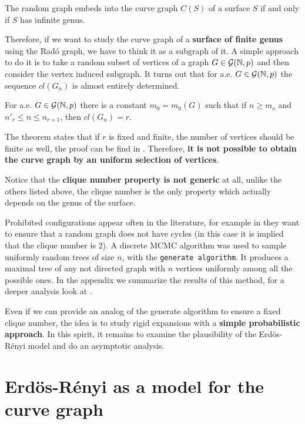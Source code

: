 \begin{theorem}
The random graph embeds into the curve graph $C(S)$ of a surface $S$ if and only if $S$ has infinite genus.
\end{theorem}

Therefore, if we want to study the curve graph of a \textbf{surface of finite genus} using the Radó graph, we have to think it as a subgraph of it. A simple approach to do it is to take a random subset of vertices of a graph $G\in \mathcal{G}(\mathbb{N}, p)$ and then consider the vertex induced subgraph. It turns out that for a.e. $G\in \mathcal{G}(\mathbb{N}, p)$ the sequence $cl(G_n)$ is almost entirely determined.

\begin{theorem}
For a.e. $G \in \mathcal{G}(\mathbb{N},p)$ there is a constant $m_0 = m_{0}(G)$ such that if $n \geq m_o$ and $n'_{r} \leq n \leq n_{r+1}$, then $cl(G_{n}) = r$.
\end{theorem}

The theorem states that if $r$ is fixed and finite, the number of vertices should be finite as well, the proof can be find in \cite[Bollobás p.~284]{Bollobas}. Therefore, \textbf{it is not possible to obtain the curve graph by an uniform selection of vertices}.

Notice that the \textbf{clique number property is not generic} at all, unlike the others listed above, the clique number is the only property which actually depends on the genus of the surface.

Prohibited configurations appear often in the literature, for example in \cite[Alcazar 15]{Alcazar15} they want to ensure that a random graph does not have cycles (in this case it is implied that the clique number is 2). A discrete MCMC algorithm was used to sample uniformly random trees of size $n$, with the \texttt{generate algorithm}. It produces a maximal tree of any not directed graph with $n$ vertices uniformly among all the possible ones. In the appendix we summarize the results of this method, for a deeper analysis look at \cite[Broder 89]{Broder89}.

Even if we can provide an analog of the generate algorithm to ensure a fixed clique number, the idea is to study rigid expansions with a \textbf{simple probabilistic approach}. In this spirit, it remains to examine the plausibility of the Erdös-Rényi model and do an asymptotic analysis.

\section{Erdös-Rényi as a model for the curve graph}

